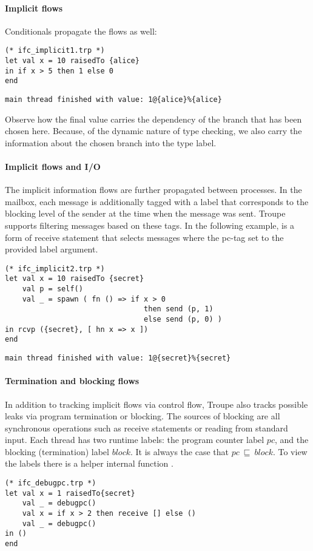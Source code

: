 \paragraph{Implicit flows}
Conditionals propagate the flows as well:


\begin{lstlisting}
(* ifc_implicit1.trp *)
let val x = 10 raisedTo {alice} 
in if x > 5 then 1 else 0 
end	
\end{lstlisting}
\begin{verbatim}
main thread finished with value: 1@{alice}%{alice}	
\end{verbatim}
Observe how the final value carries the dependency of the 
branch that has been chosen here. Because, of the dynamic nature of type checking,
we also carry the information about the chosen branch into the type label.




\paragraph{Implicit flows and I/O}
The implicit information flows are further propagated between processes. 
In the mailbox, each message is additionally tagged with a label that 
corresponds to the blocking level of the sender at the time when the message was sent.
Troupe supports filtering messages based on these tags.
In the following example,  is a form of receive statement that selects messages
where the pc-tag set to the provided label argument.

\begin{lstlisting}
(* ifc_implicit2.trp *)
let val x = 10 raisedTo {secret}
    val p = self()
    val _ = spawn ( fn () => if x > 0 
    							then send (p, 1) 
    							else send (p, 0) )
in rcvp ({secret}, [ hn x => x ])
end
\end{lstlisting}
\begin{verbatim}
main thread finished with value: 1@{secret}%{secret}
\end{verbatim}


\paragraph{Termination and blocking flows} 
In addition to tracking implicit flows via control flow, Troupe also 
tracks possible leaks via program termination or blocking.
The sources of blocking are all synchronous operations such as receive statements or reading from standard input. 
Each thread has two runtime labels: the program counter label $\mathit{pc}$, and 
the blocking (termination) label $\mathit{block}$. It is always the case that 
$\mathit{pc}~\sqsubseteq~\mathit{block}$. To view the labels there is a 
helper internal function .
\begin{lstlisting}
(* ifc_debugpc.trp *)
let val x = 1 raisedTo{secret}
    val _ = debugpc() 
    val x = if x > 2 then receive [] else () 
    val _ = debugpc() 
in () 
end    
\end{lstlisting}

